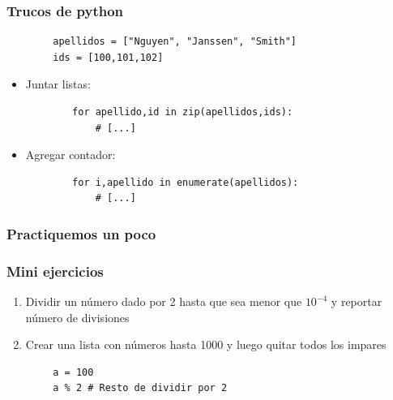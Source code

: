 \documentclass[14pt,aspectratio=169,xcolor=dvipsnames]{beamer}
\begin{document}
\begin{frame}[fragile]\frametitle{Trucos de python}
    \begin{verbatim}
        apellidos = ["Nguyen", "Janssen", "Smith"]
        ids = [100,101,102]
    \end{verbatim}
    \begin{itemize}
        \item Juntar listas:
        \begin{verbatim}
        for apellido,id in zip(apellidos,ids):
            # [...]
    \end{verbatim}
        \item Agregar contador:
    \begin{verbatim}
        for i,apellido in enumerate(apellidos):
            # [...]
    \end{verbatim}
    \end{itemize}
\end{frame}
\begin{frame}\frametitle{Practiquemos un poco}
\end{frame}
\begin{frame}
    \maketitle
\end{frame}
\begin{frame}[fragile]\frametitle{Mini ejercicios}
    \begin{enumerate}
        \item Dividir un número dado por 2 hasta que sea menor que $10^{-4}$ y reportar número de divisiones
        \item Crear una lista con números hasta 1000 y luego quitar todos los impares   
    \end{enumerate}
    \begin{verbatim}
        a = 100
        a % 2 # Resto de dividir por 2
    \end{verbatim}
\end{frame}
\end{document}
